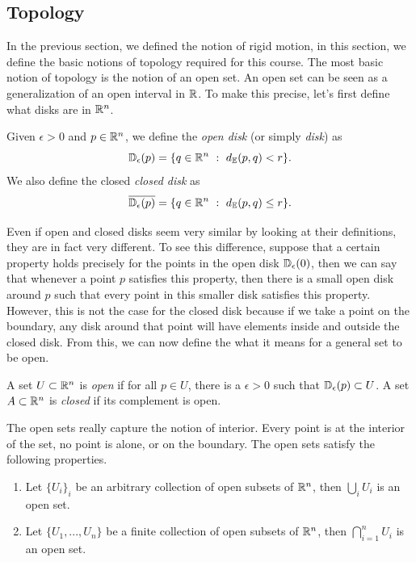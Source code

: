 \subsection{Topology}

In the previous section, we defined the notion of rigid motion, in this section, we define the basic notions of topology required for this course. The most basic notion of topology is the notion of an open set. An open set can be seen as a generalization of an open interval in $\mathbb{R}$. To make this precise, let's first define what disks are in $\mathbb{R}^n$. 

\begin{definition}
    Given $\epsilon > 0$ and $p \in \mathbb{R}^n$, we define the \textit{open disk} (or simply \textit{disk}) as
    $$\mathbb{D}_{\epsilon}(p) = \{q \in \mathbb{R}^n \ : \ d_{\mathbb{E}}(p,q) < r\}.$$
    We also define the closed \textit{closed disk} as
    $$\overline{\mathbb{D}_{\epsilon}(p)} = \{q \in \mathbb{R}^n \ : \ d_{\mathbb{E}}(p,q) \leq r\}.$$
\end{definition}

Even if open and closed disks seem very similar by looking at their definitions, they are in fact very different. To see this difference, suppose that a certain property holds precisely for the points in the open disk $\mathbb{D}_{\epsilon}(0)$, then we can say that whenever a point $p$ satisfies this property, then there is a small open disk around $p$ such that every point in this smaller disk satisfies this property. However, this is not the case for the closed disk because if we take a point on the boundary, any disk around that point will have elements inside and outside the closed disk. From this, we can now define the what it means for a general set to be open.

\begin{definition}
    A set $U \subset \mathbb{R}^n$ is \textit{open} if for all $p \in U$, there is a $\epsilon > 0$ such that $\mathbb{D}_{\epsilon}(p) \subset U$. A set $A \subset \mathbb{R}^n$ is \textit{closed} if its complement is open.
\end{definition}

The open sets really capture the notion of interior. Every point is at the interior of the set, no point is alone, or on the boundary. The open sets satisfy the following properties.
\begin{proposition}
    \begin{enumerate}
        \item Let $\{U_i\}_i$ be an arbitrary collection of open subsets of $\mathbb{R}^n$, then $\bigcup_iU_i$ is an open set.
        \item Let $\{U_1, ..., U_n\}$ be a finite collection of open subsets of $\mathbb{R}^n$, then $\bigcap_{i=1}^n U_i$ is an open set.
    \end{enumerate}
\end{proposition}

